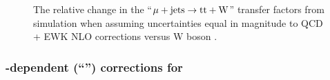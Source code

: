 \begin{figure}[!h]
{  } \\
   ~
   \\
  \caption{\label{fig:tfSyst_nlo_muToTtw} The relative change in the
    ``$\mu + \textrm{jets} \rightarrow \mathrm{tt+W}$'' transfer factors from
    simulation when assuming uncertainties equal in magnitude to QCD +
    EWK NLO corrections versus W boson \Pt.  }
\end{figure}

\clearpage
\subsubsection{\texorpdfstring{\njet}{Njet}-dependent (``\texorpdfstring{\nisr}{Nisr}'') corrections for \texorpdfstring{\ttbar}{TTbar}}

